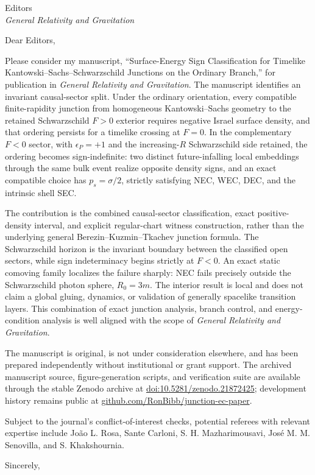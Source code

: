 \documentclass[10pt]{letter}
\date{11 August 2026}
\begin{document}
\begin{letter}{Editors\\\textit{General Relativity and Gravitation}}
\opening{Dear Editors,}

Please consider my manuscript, ``Surface-Energy Sign Classification for Timelike Kantowski--Sachs--Schwarzschild Junctions on the Ordinary Branch,'' for publication in \textit{General Relativity and Gravitation}. The manuscript identifies an invariant causal-sector split. Under the ordinary orientation, every compatible finite-rapidity junction from homogeneous Kantowski--Sachs geometry to the retained Schwarzschild $F>0$ exterior requires negative Israel surface density, and that ordering persists for a timelike crossing at $F=0$. In the complementary $F<0$ sector, with $\epsilon_P=+1$ and the increasing-$R$ Schwarzschild side retained, the ordering becomes sign-indefinite: two distinct future-infalling local embeddings through the same bulk event realize opposite density signs, and an exact compatible choice has $p_s=\sigma/2$, strictly satisfying NEC, WEC, DEC, and the intrinsic shell SEC.

The contribution is the combined causal-sector classification, exact positive-density interval, and explicit regular-chart witness construction, rather than the underlying general Berezin--Kuzmin--Tkachev junction formula. The Schwarzschild horizon is the invariant boundary between the classified open sectors, while sign indeterminacy begins strictly at $F<0$. An exact static comoving family localizes the failure sharply: NEC fails precisely outside the Schwarzschild photon sphere, $R_0=3m$. The interior result is local and does not claim a global gluing, dynamics, or validation of generally spacelike transition layers. This combination of exact junction analysis, branch control, and energy-condition analysis is well aligned with the scope of \textit{General Relativity and Gravitation}.

The manuscript is original, is not under consideration elsewhere, and has been prepared independently without institutional or grant support. The archived manuscript source, figure-generation scripts, and verification suite are available through the stable Zenodo archive at \href{https://doi.org/10.5281/zenodo.21872425}{doi:10.5281/zenodo.21872425}; development history remains public at \href{https://github.com/RonBibb/junction-ec-paper}{github.com/RonBibb/junction-ec-paper}.

Subject to the journal's conflict-of-interest checks, potential referees with relevant expertise include Jo\~ao L. Rosa, Sante Carloni, S. H. Mazharimousavi, Jos\'e M. M. Senovilla, and S. Khakshournia.

\closing{Sincerely,}
\end{letter}
\end{document}
